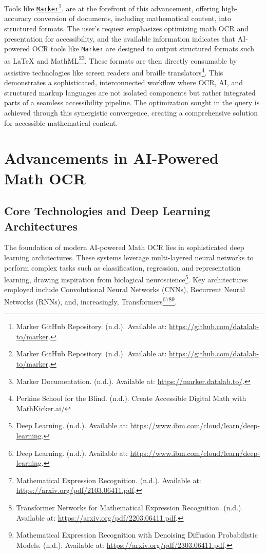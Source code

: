 Tools like \href{https://github.com/datalab-to/marker}{\texttt{Marker}}\footnote{Marker GitHub Repository. (n.d.). Available at: \url{https://github.com/datalab-to/marker}.}. are at the forefront of this advancement, offering high-accuracy conversion of documents, including mathematical content, into structured formats. The user's request emphasizes optimizing math OCR and presentation for accessibility, and the available information indicates that AI-powered OCR tools like \texttt{Marker} are designed to output structured formats such as LaTeX and MathML\footnote{Marker GitHub Repository. (n.d.). Available at: \url{https://github.com/datalab-to/marker}.}\footnote{Marker Documentation. (n.d.). Available at: \url{https://marker.datalab.to/}.}. These formats are then directly consumable by assistive technologies like screen readers and braille translators\footnote{Perkins School for the Blind. (n.d.). Create Accessible Digital Math with MathKicker.ai/}. This demonstrates a sophisticated, interconnected workflow where OCR, AI, and structured markup languages are not isolated components but rather integrated parts of a seamless accessibility pipeline. The optimization sought in the query is achieved through this synergistic convergence, creating a comprehensive solution for accessible mathematical content.

\section{Advancements in AI-Powered Math OCR}\label{sec:ai-math-ocr}
\subsection{Core Technologies and Deep Learning Architectures}\label{subsec:core-tech-deep-learning}
The foundation of modern AI-powered Math OCR lies in sophisticated deep learning architectures. These systems leverage multi-layered neural networks to perform complex tasks such as classification, regression, and representation learning, drawing inspiration from biological neuroscience\footnote{Deep Learning. (n.d.). Available at: \url{https://www.ibm.com/cloud/learn/deep-learning}.}. Key architectures employed include Convolutional Neural Networks (CNNs), Recurrent Neural Networks (RNNs), and, increasingly, Transformers\footnote{Deep Learning. (n.d.). Available at: \url{https://www.ibm.com/cloud/learn/deep-learning}.}\footnote{Mathematical Expression Recognition. (n.d.). Available at: \url{https://arxiv.org/pdf/2103.06411.pdf}.}\footnote{Transformer Networks for Mathematical Expression Recognition. (n.d.). Available at: \url{https://arxiv.org/pdf/2203.06411.pdf}.}\footnote{Mathematical Expression Recognition with Denoising Diffusion Probabilistic Models. (n.d.). Available at: \url{https://arxiv.org/pdf/2303.06411.pdf}.}.

